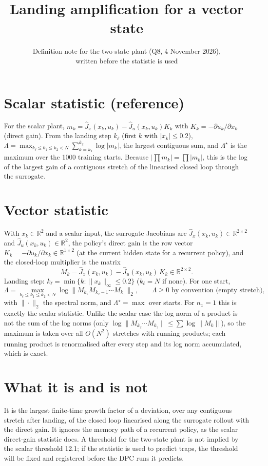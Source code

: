 \documentclass[11pt]{article}
\title{Landing amplification for a vector state}
\author{Definition note for the two-state plant (Q8, 4 November 2026),\\ written before the statistic is used}
\date{}
\begin{document}
\maketitle

\section{Scalar statistic (reference)}
For the scalar plant, $m_k = \hat J_x(x_k,u_k) - \hat J_u(x_k,u_k) K_k$ with $K_k = -\partial u_k/\partial x_k$ (direct gain).
From the landing step $k_\ell$ (first $k$ with $|x_k|\le 0.2$),
$\Lambda = \max_{k_\ell \le k_1 \le k_2 < N} \sum_{k=k_1}^{k_2} \log|m_k|$, the largest contiguous sum, and
$\Lambda^\star$ is the maximum over the 1000 training starts. Because $|\prod m_k| = \prod |m_k|$, this is the log of the
largest gain of a contiguous stretch of the linearised closed loop through the surrogate.

\section{Vector statistic}
With $x_k \in \mathbb{R}^2$ and a scalar input, the surrogate Jacobians are $\hat J_x(x_k,u_k) \in \mathbb{R}^{2\times 2}$ and
$\hat J_u(x_k,u_k) \in \mathbb{R}^{2}$, the policy's direct gain is the row vector $K_k = -\partial u_k / \partial x_k \in
\mathbb{R}^{1\times 2}$ (at the current hidden state for a recurrent policy), and the closed-loop multiplier is the matrix
\[
  M_k = \hat J_x(x_k,u_k) - \hat J_u(x_k,u_k)\, K_k \in \mathbb{R}^{2\times 2}.
\]
Landing step: $k_\ell = \min\{k : \|x_k\|_\infty \le 0.2\}$ ($k_\ell = N$ if none). For one start,
\[
  \Lambda = \max_{k_\ell \le k_1 \le k_2 < N} \log \big\| M_{k_2} M_{k_2-1} \cdots M_{k_1} \big\|_2 ,
  \qquad \Lambda \ge 0 \text{ by convention (empty stretch)},
\]
with $\|\cdot\|_2$ the spectral norm, and $\Lambda^\star = \max$ over starts. For $n_x = 1$ this is exactly the scalar
statistic. Unlike the scalar case the log norm of a product is not the sum of the log norms (only
$\log\|M_{k_2}\cdots M_{k_1}\| \le \sum \log\|M_k\|$), so the maximum is taken over all $O(N^2)$ stretches with running
products; each running product is renormalised after every step and its log norm accumulated, which is exact.

\section{What it is and is not}
It is the largest finite-time growth factor of a deviation, over any contiguous stretch after landing, of the closed loop
linearised along the surrogate rollout with the direct gain. It ignores the memory path of a recurrent policy, as the scalar
direct-gain statistic does. A threshold for the two-state plant is not implied by the scalar threshold 12.1; if the
statistic is used to predict traps, the threshold will be fixed and registered before the DPC runs it predicts.
\end{document}
